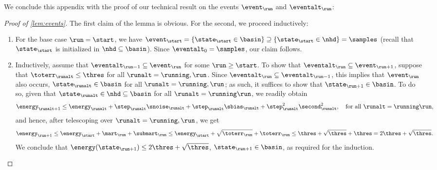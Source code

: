 We conclude this appendix with the proof of our technical result on the events $\curr[\event]$ and $\curr[\eventalt]$:

\begin{proof}[Proof of \cref{lem:events}]
The first claim of the lemma is obvious.
For the second, we proceed inductively:

\begin{enumerate}[leftmargin=2.5em]
\item
For the base case $\run=\start$, we have $\init[\event] = \{\init \in \basin \} \supseteq \{\init \in \nhd \} = \samples$ (recall that $\init$ is initialized in $\nhd \subseteq \basin$).
Since $\eventalt_{0} = \samples$, our claim follows.

\item
Inductively, assume that $\prev[\eventalt] \subseteq \curr[\event]$ for some $\run\geq\start$.
To show that $\curr[\eventalt] \subseteq \next[\event]$,
suppose that $\iter[\toterr] \leq \thres$ for all $\runalt=\running,\run$.
Since $\curr[\eventalt] \subseteq \prev[\eventalt]$, this implies that $\curr[\event]$ also occurs, \ie $\iter\in\basin$ for all $\runalt=\running,\run$;
as such, it suffices to show that $\next\in\basin$.
To do so, given that $\iter\in\nhd\subseteq\basin$ for all $\runalt=\running\run$,
we readily obtain
\begin{equation}
\afteriter[\energy]
	\leq \iter[\energy]
		+ \iter[\step] \iter[\snoise]
		+ \iter[\step] \iter[\sbias]
		+ \iter[\step]^{2} \iter[\second]^{2},
	\quad
	\text{for all $\runalt = \running\run$},
\end{equation}
and hence, after telescoping over $\runalt = \running,\run$, we get
\begin{equation}
\next[\energy]
	\leq \init[\energy]
		+ \curr[\mart]
		+ \curr[\submart]
	\leq \init[\energy]
		+ \sqrt{\curr[\toterr]}
		+ \curr[\toterr]
	\leq \thres
		+ \sqrt{\thres}
		+ \thres
	= 2\thres + \sqrt{\thres}.
\end{equation}
We conclude that $\energy(\next) \leq 2\thres + \sqrt{\thres}$, \ie $\next\in\basin$, as required for the induction.
\end{enumerate}


\end{proof}
